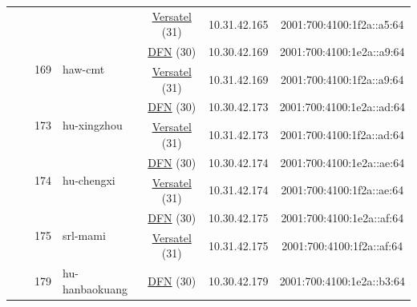 \begin{small}
\begin{center}
\begin{longtable}{|c|c|c|c|c|c|c|c|}
  &  &  &  & \multicolumn{2}{|c|}{\tiny{\href{http://www.versatel.de}{Versatel} (31)}} & \tiny{10.31.42.165} & \tiny{2001:700:4100:1f2a::a5:64} \\* \cline{3-3}\cline{4-4}\cline{5-5}\cline{6-6}\cline{7-7}\cline{8-8}
  &  & \multirow{2}{*}{\tiny{169}} & \multicolumn{1}{|l|}{\multirow{2}{*}{\tiny{haw-cmt}}} & \multicolumn{2}{|c|}{\tiny{\href{https://www.dfn.de}{DFN} (30)}} & \tiny{10.30.42.169} & \tiny{2001:700:4100:1e2a::a9:64} \\* \cline{5-5}\cline{6-6}\cline{7-7}\cline{8-8}
  &  &  &  & \multicolumn{2}{|c|}{\tiny{\href{http://www.versatel.de}{Versatel} (31)}} & \tiny{10.31.42.169} & \tiny{2001:700:4100:1f2a::a9:64} \\* \cline{3-3}\cline{4-4}\cline{5-5}\cline{6-6}\cline{7-7}\cline{8-8}
  &  & \multirow{2}{*}{\tiny{173}} & \multicolumn{1}{|l|}{\multirow{2}{*}{\tiny{hu-xingzhou}}} & \multicolumn{2}{|c|}{\tiny{\href{https://www.dfn.de}{DFN} (30)}} & \tiny{10.30.42.173} & \tiny{2001:700:4100:1e2a::ad:64} \\* \cline{5-5}\cline{6-6}\cline{7-7}\cline{8-8}
  &  &  &  & \multicolumn{2}{|c|}{\tiny{\href{http://www.versatel.de}{Versatel} (31)}} & \tiny{10.31.42.173} & \tiny{2001:700:4100:1f2a::ad:64} \\* \cline{3-3}\cline{4-4}\cline{5-5}\cline{6-6}\cline{7-7}\cline{8-8}
  &  & \multirow{2}{*}{\tiny{174}} & \multicolumn{1}{|l|}{\multirow{2}{*}{\tiny{hu-chengxi}}} & \multicolumn{2}{|c|}{\tiny{\href{https://www.dfn.de}{DFN} (30)}} & \tiny{10.30.42.174} & \tiny{2001:700:4100:1e2a::ae:64} \\* \cline{5-5}\cline{6-6}\cline{7-7}\cline{8-8}
  &  &  &  & \multicolumn{2}{|c|}{\tiny{\href{http://www.versatel.de}{Versatel} (31)}} & \tiny{10.31.42.174} & \tiny{2001:700:4100:1f2a::ae:64} \\* \cline{3-3}\cline{4-4}\cline{5-5}\cline{6-6}\cline{7-7}\cline{8-8}
  &  & \multirow{2}{*}{\tiny{175}} & \multicolumn{1}{|l|}{\multirow{2}{*}{\tiny{srl-mami}}} & \multicolumn{2}{|c|}{\tiny{\href{https://www.dfn.de}{DFN} (30)}} & \tiny{10.30.42.175} & \tiny{2001:700:4100:1e2a::af:64} \\* \cline{5-5}\cline{6-6}\cline{7-7}\cline{8-8}
  &  &  &  & \multicolumn{2}{|c|}{\tiny{\href{http://www.versatel.de}{Versatel} (31)}} & \tiny{10.31.42.175} & \tiny{2001:700:4100:1f2a::af:64} \\* \cline{3-3}\cline{4-4}\cline{5-5}\cline{6-6}\cline{7-7}\cline{8-8}
  &  & \multirow{2}{*}{\tiny{179}} & \multicolumn{1}{|l|}{\multirow{2}{*}{\tiny{hu-hanbaokuang}}} & \multicolumn{2}{|c|}{\tiny{\href{https://www.dfn.de}{DFN} (30)}} & \tiny{10.30.42.179} & \tiny{2001:700:4100:1e2a::b3:64} \\* \cline{5-5}\cline{6-6}\cline{7-7}\cline{8-8}

\end{longtable}
\end{center}
\end{small}

